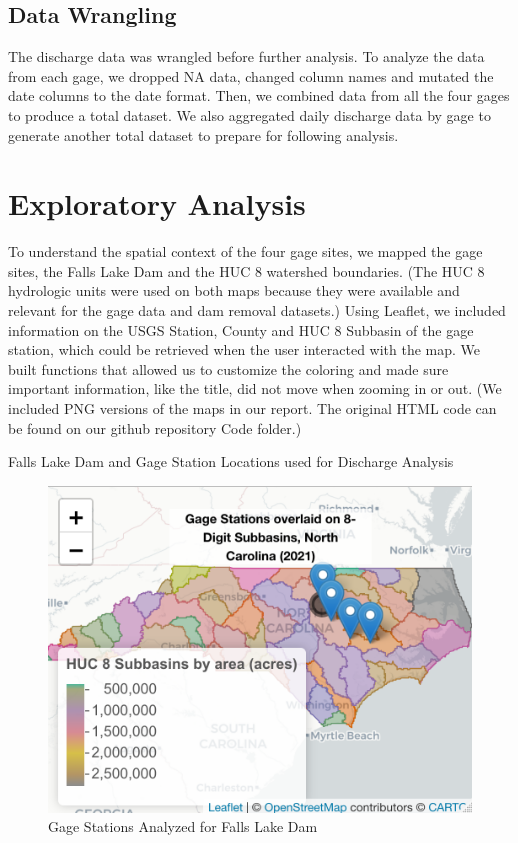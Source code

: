 \documentclass[
  12pt,
]{article}
\begin{document}
\hypertarget{data-wrangling}{%
\subsection{Data Wrangling}\label{data-wrangling}}

The discharge data was wrangled before further analysis. To analyze the
data from each gage, we dropped NA data, changed column names and
mutated the date columns to the date format. Then, we combined data from
all the four gages to produce a total dataset. We also aggregated daily
discharge data by gage to generate another total dataset to prepare for
following analysis.

\newpage

\hypertarget{exploratory-analysis}{%
\section{Exploratory Analysis}\label{exploratory-analysis}}

To understand the spatial context of the four gage sites, we mapped the
gage sites, the Falls Lake Dam and the HUC 8 watershed boundaries. (The
HUC 8 hydrologic units were used on both maps because they were
available and relevant for the gage data and dam removal datasets.)
Using Leaflet, we included information on the USGS Station, County and
HUC 8 Subbasin of the gage station, which could be retrieved when the
user interacted with the map. We built functions that allowed us to
customize the coloring and made sure important information, like the
title, did not move when zooming in or out. (We included PNG versions of
the maps in our report. The original HTML code can be found on our
github repository Code folder.)

Falls Lake Dam and Gage Station Locations used for Discharge Analysis

\begin{figure}
\centering
\includegraphics{"./Output/gage.station.png"}
\caption{Gage Stations Analyzed for Falls Lake Dam}
\end{figure}
\end{document}
